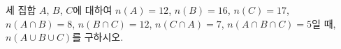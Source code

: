 세 집합 $A$, $B$, $C$에 대하여 $n(A)=12$, $n(B)=16$, $n(C)=17$, $n(A\cap B)=8$, $n(B\cap C)=12$, $n(C\cap A)=7$, $n(A\cap B\cap C)=5$일 때, $n(A\cup B\cup C)$를 구하시오.
